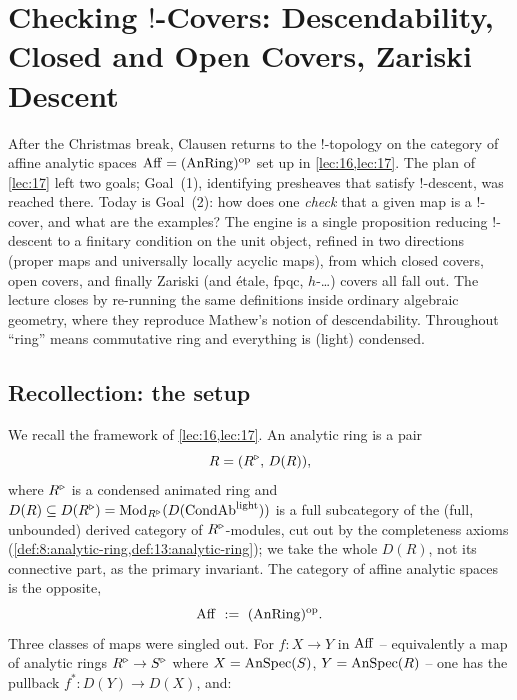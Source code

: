 \section{Checking \texorpdfstring{$!$}{!}-Covers: Descendability, Closed and Open Covers, Zariski Descent}
\label{lec:18}

After the Christmas break, Clausen returns to the $!$-topology on the category
of affine analytic spaces $\operatorname{Aff}=(\operatorname{AnRing})^{\mathrm{op}}$ set up in
\cref{lec:16,lec:17}. The plan of \cref{lec:17} left two goals; Goal~(1),
identifying presheaves that satisfy $!$-descent, was reached there. Today is
Goal~(2): how does one \emph{check} that a given map is a $!$-cover, and what are
the examples? The engine is a single proposition reducing $!$-descent to a
finitary condition on the unit object, refined in two directions (proper maps and
universally locally acyclic maps), from which closed covers, open covers, and
finally Zariski (and \'etale, fpqc, $h$-\dots) covers all fall out. The lecture
closes by re-running the same definitions inside ordinary algebraic geometry,
where they reproduce Mathew's notion of descendability. Throughout ``ring'' means
commutative ring and everything is (light) condensed.

\subsection{Recollection: the setup}
\label{subsec:18:recollection}

We recall the framework of \cref{lec:16,lec:17}. An analytic ring is a pair
\begin{equation*}
R=(R^{\triangleright},\,D(R)),
\end{equation*}
where $R^{\triangleright}$ is a condensed animated ring and $D(R)\subseteq D(R^{\triangleright})=
\operatorname{Mod}_{R^{\triangleright}}(D(\mathrm{CondAb}^{\mathrm{light}}))$ is a full subcategory of the (full, unbounded) derived
category of $R^{\triangleright}$-modules, cut out by the completeness axioms
(\cref{def:8:analytic-ring,def:13:analytic-ring}); we take the whole $D(R)$, not
its connective part, as the primary invariant. The category of affine analytic
spaces is the opposite,
\begin{equation}
\label{eq:18:aff}
\operatorname{Aff}\ :=\ (\operatorname{AnRing})^{\mathrm{op}}.
\end{equation}
Three classes of maps were singled out. For $f\colon X\to Y$ in $\operatorname{Aff}$ --
equivalently a map of analytic rings $R^{\triangleright}\to S^{\triangleright}$ where $X=\operatorname{AnSpec}(S)$,
$Y=\operatorname{AnSpec}(R)$ -- one has the pullback $f^*\colon D(Y)\to D(X)$, and:

